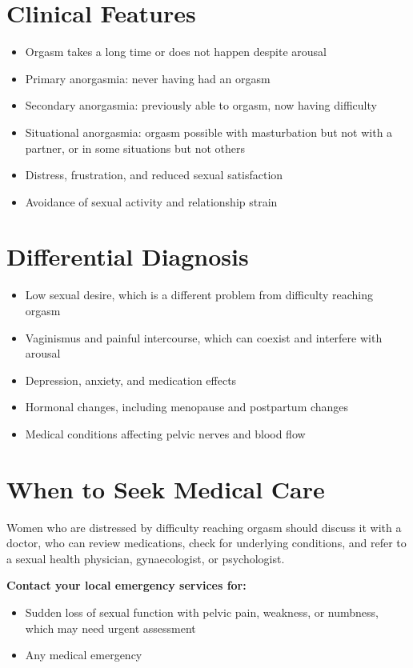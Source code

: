 \section*{Clinical Features}
\begin{itemize}
    \item Orgasm takes a long time or does not happen despite arousal
    \item Primary anorgasmia: never having had an orgasm
    \item Secondary anorgasmia: previously able to orgasm, now having difficulty
    \item Situational anorgasmia: orgasm possible with masturbation but not with a partner, or in some situations but not others
    \item Distress, frustration, and reduced sexual satisfaction
    \item Avoidance of sexual activity and relationship strain
\end{itemize}

\section*{Differential Diagnosis}
\begin{itemize}
    \item Low sexual desire, which is a different problem from difficulty reaching orgasm
    \item Vaginismus and painful intercourse, which can coexist and interfere with arousal
    \item Depression, anxiety, and medication effects
    \item Hormonal changes, including menopause and postpartum changes
    \item Medical conditions affecting pelvic nerves and blood flow
\end{itemize}

\section*{When to Seek Medical Care}
Women who are distressed by difficulty reaching orgasm should discuss it with a doctor, who can review medications, check for underlying conditions, and refer to a sexual health physician, gynaecologist, or psychologist.

\textbf{Contact your local emergency services for:}
\begin{itemize}
    \item Sudden loss of sexual function with pelvic pain, weakness, or numbness, which may need urgent assessment
    \item Any medical emergency
\end{itemize}

